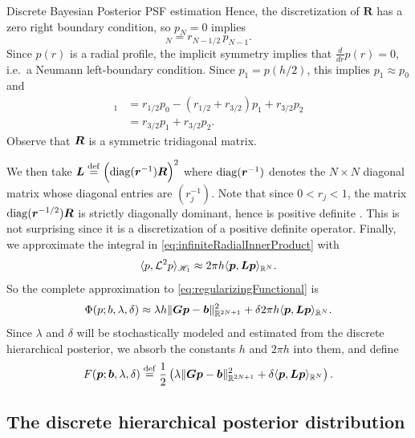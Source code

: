 \begin{chapter}{Discrete Bayesian Posterior PSF estimation}
Hence, the discretization of $\bm R$ has a zero right boundary condition, so $p_{N}= 0$ implies
\begin{equation}
  [\vect R\vect p]_N = r_{N-1/2}\,p_{N-1}.
\end{equation}
Since $p(r)$ is a radial profile, the implicit symmetry implies that $\frac d{dr}p(r) = 0$, i.e.~a Neumann left-boundary condition. 
Since $p_1 = p( h/2 )$, this implies $p_1 \approx p_{0}$ and
\begin{align}
  [\vect R\vect p]_1 &= r_{1/2}p_0 - (r_{1/2}+r_{3/2})p_1 + r_{3/2}p_{2} \nonumber\\
  &= r_{3/2}p_1 + r_{3/2}p_{2}.
\end{align}
Observe that $\mbox{\boldmath$R$}$ is a symmetric tridiagonal matrix.

We then take $\mbox{\boldmath$L$} \stackrel{\rm def}{=} \Big(\mathrm{diag}(\mbox{\boldmath$r$}^{-1}) \mbox{\boldmath$R$}\Big)^2$ where $\mathrm{diag}(\mbox{\boldmath$r$}^{-1})$ denotes the $N\times N$ diagonal matrix whose diagonal entries are $(r_j^{-1})$.
Note that since $0<r_j<1$, the matrix $\mathrm{diag}(\mbox{\boldmath$r$}^{-1/2}) \mbox{\boldmath$R$}$ is strictly diagonally dominant, hence is positive definite \citep[Theorem 3.4.3]{golub2012matrix}.
This is not surprising since it is a discretization of a positive definite operator.
Finally, we approximate the integral in \eqref{eq:infiniteRadialInnerProduct} with 
\begin{equation}\label{eq:psfDiscInvProblem}
  \langle p, \mathcal L^2 p\rangle_{\mathscr H_1} \approx 2\pi h \langle \mbox{\boldmath$p$}, \mbox{\boldmath$L$} \mbox{\boldmath$p$}\rangle_{\mathbb R^N}.
\end{equation}
So the complete approximation to \eqref{eq:regularizingFunctional} is
\begin{equation} \label{eq:discreteRegularizingFunctional}
  \Phi(p; b,\lambda,\delta) \approx \lambda h \|\mbox{\boldmath$G$}\mbox{\boldmath$p$} - \mbox{\boldmath$b$}\|_{\mathbb R^{2N+1}}^2 + \delta 2\pi h\langle \mbox{\boldmath$p$}, \mbox{\boldmath$L$} \mbox{\boldmath$p$}\rangle_{\mathbb R^N}.
\end{equation}
Since $\lambda$ and $\delta$ will be stochastically modeled and estimated from the discrete hierarchical posterior, we absorb the constants $h$ and $2\pi h$ into them, and define
\begin{equation} \label{discreteRegularizingFunctional}
  F(\mbox{\boldmath$p$}; \mbox{\boldmath$b$},\lambda,\delta) \stackrel{\rm def}{=} \frac 12\left(\lambda \|\mbox{\boldmath$G$}\mbox{\boldmath$p$} - \mbox{\boldmath$b$}\|_{\mathbb R^{2N+1}}^2 + \delta \langle \mbox{\boldmath$p$}, \mbox{\boldmath$L$} \mbox{\boldmath$p$}\rangle_{\mathbb R^N}\right).
\end{equation}
\subsection{The discrete hierarchical posterior distribution} \label{subsec:discretePosteriorDerivation}


\end{chapter}
